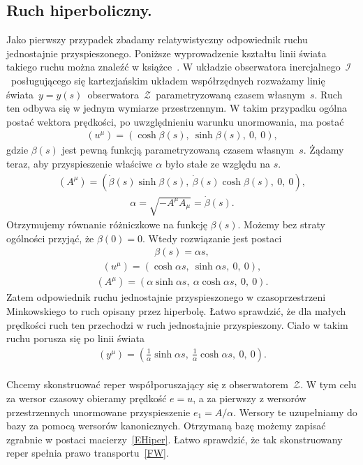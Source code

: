 \subsection{Ruch hiperboliczny.}
Jako pierwszy przypadek zbadamy relatywistyczny 
odpowiednik ruchu jednostajnie 
przyspieszonego.
Poniższe wyprowadzenie kształtu linii 
świata takiego ruchu można znaleźć 
w książce~\cite{trau1984}.
W układzie obserwatora inercjalnego~$\mathcal{I}$~posługującego się 
kartezjańskim układem współrzędnych rozważamy linię 
świata~$y=y(s)$~obserwatora~$\mathcal{Z}$~parametryzowaną 
czasem własnym~$s$.
Ruch ten odbywa się w jednym wymiarze przestrzennym. 
W takim przypadku ogólna postać wektora prędkości, 
po uwzględnieniu warunku 
unormowania, ma postać
\begin{align}\label{UHiper}
(u^\mu) = (\cosh \beta( s ),\ \sinh \beta( s ),\ 0,\   0),
\end{align}
gdzie $\beta( s)$ jest pewną funkcją parametryzowaną czasem własnym~$s$.
Żądamy teraz, 
aby przyspieszenie właściwe $\alpha$ 
było stałe ze względu na $s$. 
\begin{align}\nonumber
(A^\mu) = ( \dot{\beta}( s ) \sinh \beta( s ),\ 
\dot{\beta}( s ) \cosh \beta( s ),\ 0,\ 0 ),
\end{align}
\begin{align}\nonumber
\alpha = \sqrt{ - A^\mu A_\mu } = \dot{\beta}( s ).
\end{align}
Otrzymujemy równanie różniczkowe na funkcję $\beta(s)$. 
Możemy bez straty ogólności przyjąć, że $\beta(0)  = 0$. 
Wtedy rozwiązanie jest postaci
\begin{align}\nonumber
\beta( s ) = \alpha s,
\end{align}
\begin{align}\nonumber
(u^\mu) = (\cosh \alpha s ,\ \sinh \alpha s ,\ 0,\   0),
\end{align}
\begin{align}\nonumber
(A^\mu) = ( \alpha \sinh \alpha s,\ \alpha \cosh \alpha s,\ 0,\ 0 ).
\end{align}
Zatem odpowiednik ruchu jednostajnie przyspieszonego w
czasoprzestrzeni Minkowskiego to ruch opisany przez hiperbolę.
Łatwo sprawdzić, że dla małych prędkości ruch ten przechodzi 
w ruch jednostajnie przyspieszony. Ciało w takim ruchu porusza
się po linii świata
\begin{align}\label{YHiper}
(y^\mu) = \left( \frac{1}{\alpha} \sinh \alpha s,\ 
\frac{1}{\alpha} \cosh \alpha s,\ 0,\ 0 \right).
\end{align}
\\
Chcemy skonstruować reper współporuszający się z 
obserwatorem~$\mathcal{Z}$. 
W tym celu za wersor czasowy obieramy prędkość $e = u$, 
a za pierwszy z wersorów przestrzennych unormowane 
przyspieszenie $e_1 = A/\alpha$.
Wersory te uzupełniamy do bazy za pomocą wersorów kanonicznych.
Otrzymaną bazę możemy zapisać zgrabnie w postaci 
macierzy~\eqref{EHiper}.
Łatwo sprawdzić, że tak skonstruowany reper spełnia
prawo transportu~\eqref{FW}.


